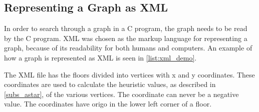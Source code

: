 


\subsection{Representing a Graph as XML}

In order to search through a graph in a C program, the graph needs to be read by the C program. XML was chosen as the markup language for representing a graph, because of its readability for both humans and computers. An example of how a graph is represented as XML is seen in \cref{list:xml_demo}.

The XML file has the floors divided into vertices with x and y coordinates. These coordinates are used to calculate the heuristic values, as described in \cref{subs_astar}, of the various vertices. The coordinate can never be a negative value. The coordinates have origo in the lower left corner of a floor.






